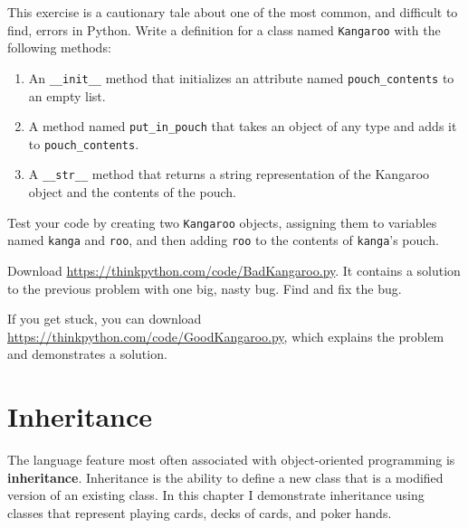 \documentclass[10pt]{book}
\begin{document}
\begin{exercise}
\label{kangaroo}

This exercise is a cautionary tale about one of the most
common, and difficult to find, errors in Python.
Write a definition for a class named {\tt Kangaroo} with the following
methods:

\begin{enumerate}

\item An \verb"__init__" method that initializes an attribute named
\verb"pouch_contents" to an empty list.

\item A method named \verb"put_in_pouch" that takes an object
of any type and adds it to \verb"pouch_contents".

\item A \verb"__str__" method that returns a string representation
of the Kangaroo object and the contents of the pouch.

\end{enumerate}
%
Test your code
by creating two {\tt Kangaroo} objects, assigning them to variables
named {\tt kanga} and {\tt roo}, and then adding {\tt roo} to the
contents of {\tt kanga}'s pouch.

Download \url{https://thinkpython.com/code/BadKangaroo.py}.  It contains
a solution to the previous problem with one big, nasty bug.
Find and fix the bug.

If you get stuck, you can download
\url{https://thinkpython.com/code/GoodKangaroo.py}, which explains the
problem and demonstrates a solution.

\end{exercise}



\chapter{Inheritance}

The language feature most often associated with object-oriented
programming is {\bf inheritance}.  Inheritance is the ability to
define a new class that is a modified version of an existing class.
In this chapter I demonstrate inheritance using classes that represent
playing cards, decks of cards, and poker hands.
\end{document}
